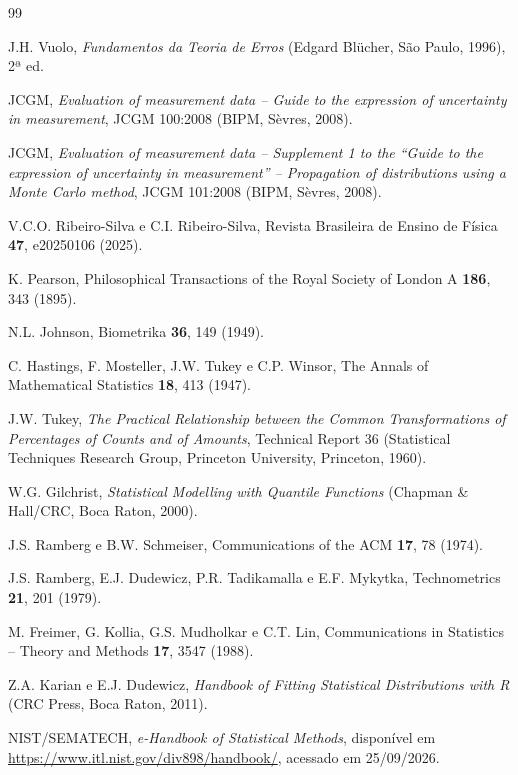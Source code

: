 \begin{thebibliography}{99}

 J.H. Vuolo, \textit{Fundamentos da Teoria de Erros} (Edgard Blücher, São Paulo, 1996), 2ª ed.

 JCGM, \textit{Evaluation of measurement data -- Guide to the expression of uncertainty in measurement}, JCGM 100:2008 (BIPM, Sèvres, 2008).

 JCGM, \textit{Evaluation of measurement data -- Supplement 1 to the ``Guide to the expression of uncertainty in measurement'' -- Propagation of distributions using a Monte Carlo method}, JCGM 101:2008 (BIPM, Sèvres, 2008).

 V.C.O. Ribeiro-Silva e C.I. Ribeiro-Silva, Revista Brasileira de Ensino de Física \textbf{47}, e20250106 (2025).

 K. Pearson, Philosophical Transactions of the Royal Society of London A \textbf{186}, 343 (1895).

 N.L. Johnson, Biometrika \textbf{36}, 149 (1949).

 C. Hastings, F. Mosteller, J.W. Tukey e C.P. Winsor, The Annals of Mathematical Statistics \textbf{18}, 413 (1947).

 J.W. Tukey, \textit{The Practical Relationship between the Common Transformations of Percentages of Counts and of Amounts}, Technical Report 36 (Statistical Techniques Research Group, Princeton University, Princeton, 1960).

 W.G. Gilchrist, \textit{Statistical Modelling with Quantile Functions} (Chapman \& Hall/CRC, Boca Raton, 2000).

 J.S. Ramberg e B.W. Schmeiser, Communications of the ACM \textbf{17}, 78 (1974).

 J.S. Ramberg, E.J. Dudewicz, P.R. Tadikamalla e E.F. Mykytka, Technometrics \textbf{21}, 201 (1979).

 M. Freimer, G. Kollia, G.S. Mudholkar e C.T. Lin, Communications in Statistics -- Theory and Methods \textbf{17}, 3547 (1988).

 Z.A. Karian e E.J. Dudewicz, \textit{Handbook of Fitting Statistical Distributions with R} (CRC Press, Boca Raton, 2011).

 NIST/SEMATECH, \textit{e-Handbook of Statistical Methods}, disponível em \url{https://www.itl.nist.gov/div898/handbook/}, acessado em 25/09/2026.


\end{thebibliography}
